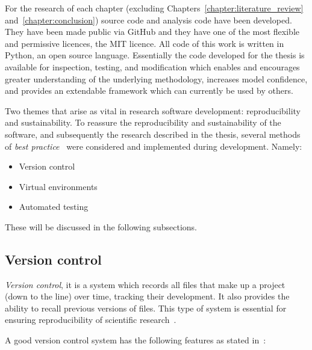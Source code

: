 For the research of each chapter (excluding Chapters~\ref{chapter:literature_review}
and~\ref{chapter:conclusion}) source code and analysis code have been developed.
They have been made public via GitHub and they have one of the most flexible and
permissive licences, the MIT licence. All code of this work is written in Python, an open source
language. Essentially the code developed for the thesis is available for inspection,
testing, and modification which enables and encourages
greater understanding of the underlying methodology, increases model confidence,
and provides an extendable framework which can currently be used by others.

Two themes that arise as vital in research software development:
reproducibility and sustainability. To reassure the reproducibility and
sustainability of the software, and subsequently the research described in the
thesis, several methods of
\textit{best practice}~\cite{Aberdour2007, Benureau2018, Crick2014, Hong2015}
were considered and implemented during development. Namely:

\begin{itemize}
    \item Version control
    \item Virtual environments
    \item Automated testing
\end{itemize}

These will be discussed in the following subsections.

\subsection{Version control}

\textit{Version control}, it is a system which records all files that make up a
project (down to the line) over time, tracking their development. It also
provides the ability to recall previous versions of files. This type of system
is essential for ensuring reproducibility of scientific research~\cite{Sandve2013,
Wilson2014}.

A good version control system has the following features as stated in~\cite{Ruparelia2010}:

